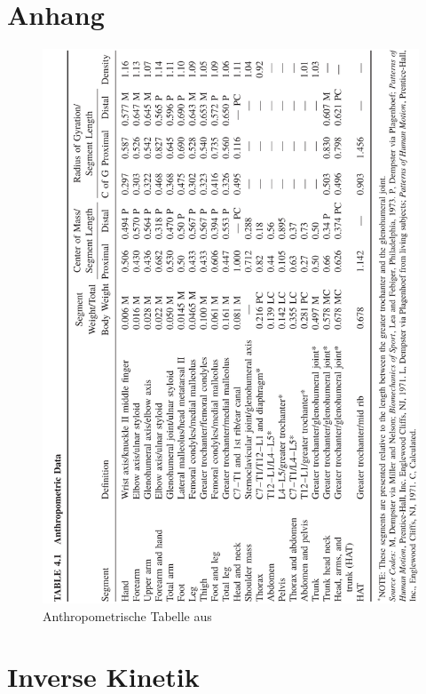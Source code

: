 \appendix                %

\setcounter{page}{1}
\section*{Anhang}%

\begin{figure}[h!]
	\centering
	\includegraphics[width=.9\linewidth]{bilder/anhang/anthrop_Tabelle}
	\caption[Anthropometrische Tabelle]{Anthropometrische Tabelle aus \textcite{winter2009biomechanics}}
	\label{fig:antrop_Tabelle}
\end{figure}

\section*{Inverse Kinetik}
